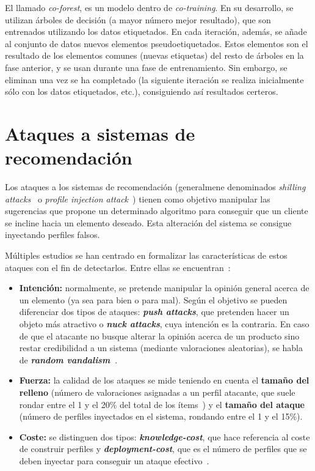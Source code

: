 El llamado \textit{co-forest}, es un modelo dentro de \textit{co-training}. En su desarrollo, se utilizan árboles de decisión (a mayor número mejor resultado), que son entrenados utilizando los datos etiquetados. En cada iteración, además, se añade al conjunto de datos nuevos elementos pseudoetiquetados. Estos elementos son el resultado de los elementos comunes (nuevas etiquetas) del resto de árboles en la fase anterior, y se usan durante una fase de entrenamiento. Sin embargo, se eliminan una vez se ha completado (la siguiente iteración se realiza inicialmente sólo con los datos etiquetados, etc.), consiguiendo así resultados certeros.

\section{Ataques a sistemas de recomendación}

Los ataques a los sistemas de recomendación (generalmene denominados \textit{shilling attacks}~\cite{mingdan2018ShillingAttacksAReview} o \textit{profile injection attack}~\cite{Mobasher2006Thesis}) tienen como objetivo manipular las sugerencias que propone un determinado algoritmo para conseguir que un cliente se incline hacia un elemento deseado. Esta alteración del sistema se consigue inyectando perfiles falsos.

Múltiples estudios se han centrado en formalizar las características de estos ataques con el fin de detectarlos. Entre ellas se encuentran~\cite{mingdan2018ShillingAttacksAReview}:

\begin{itemize}
	
	\item \textbf{Intención:} normalmente, se pretende manipular la opinión general acerca de un elemento (ya sea para bien o para mal). Según el objetivo se pueden diferenciar dos tipos de ataques: \textbf{\textit{push attacks}}, que pretenden hacer un objeto más atractivo o \textbf{\textit{nuck attacks}}, cuya intención es la contraria. En caso de que el atacante no busque alterar la opinión acerca de un producto sino restar credibilidad a un sistema (mediante valoraciones aleatorias), se habla de \textbf{\textit{random vandalism}~\cite{Burke2015RobustCollaborative}}.
	
	\item \textbf{Fuerza:} la calidad de los ataques se mide teniendo en cuenta el \textbf{tamaño del relleno} (número de valoraciones asignadas a un perfil atacante, que suele rondar entre el 1 y el 20\% del total de los ítems~\cite{mingdan2018ShillingAttacksAReview}) y el \textbf{tamaño del ataque} (número de perfiles inyectados en el sistema, rondando entre el 1 y el 15\%).
	
	\item \textbf{Coste:} se distinguen dos tipos: \textbf{\textit{knowledge-cost}}, que hace referencia al coste de construir perfiles y \textbf{\textit{deployment-cost}}, que es el número de perfiles que se deben inyectar para conseguir un ataque efectivo~\cite{Mobasher2006Thesis}.
	
\end{itemize}
		
